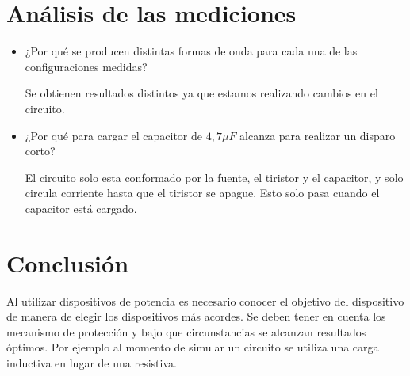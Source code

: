 \documentclass[a4paper,10pt]{article}
\begin{document}
\section{Análisis de las mediciones}

\begin{itemize}
	\item ¿Por qué se producen distintas formas de onda para cada una de las configuraciones medidas?
	
Se obtienen resultados distintos ya que estamos realizando cambios en el circuito.
	
	
	\item	 ¿Por qué para cargar el capacitor de $4,7\unit{\mu F}$ alcanza para realizar un disparo corto?
	
El circuito solo esta conformado por la fuente, el tiristor y el capacitor, y solo circula corriente hasta que el tiristor se apague. Esto solo pasa cuando el capacitor está cargado.

\end{itemize}

\section{Conclusión}
Al utilizar dispositivos de potencia es necesario conocer el objetivo del dispositivo de manera de elegir los dispositivos más acordes. Se deben tener en cuenta los mecanismo de protección y bajo que circunstancias se alcanzan resultados óptimos. Por ejemplo al momento de simular un circuito se utiliza una carga inductiva en lugar de una resistiva.
\end{document}
